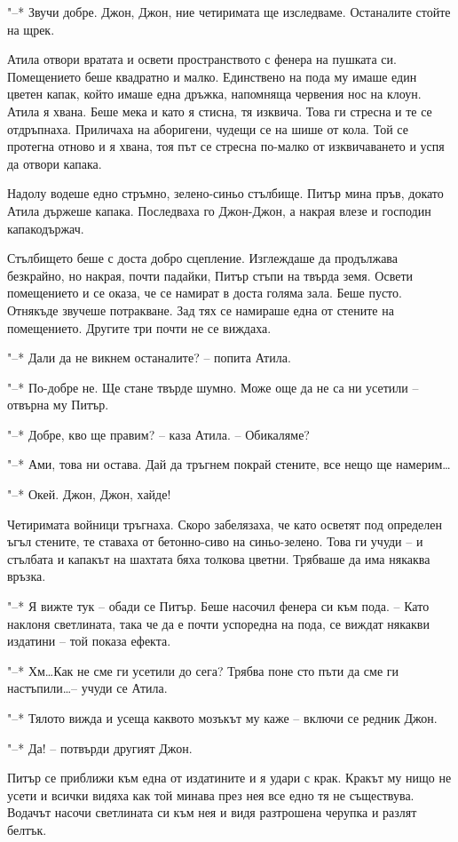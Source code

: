 \documentclass[ebook,openany,12pt]{memoir}
\begin{document}
"--* Звучи добре. Джон, Джон, ние четиримата ще изследваме. Останалите стойте на щрек.

Атила отвори вратата и освети пространството с фенера на пушката си. Помещението беше квадратно и малко. Единствено на пода му имаше един цветен капак, който имаше една дръжка, напомняща червения нос на клоун. Атила я хвана. Беше мека и като я стисна, тя изквича. Това ги стресна и те се отдръпнаха. Приличаха на аборигени, чудещи се на шише от кола. Той се протегна отново и я хвана, тоя път се стресна по-малко от изквичаването и успя да отвори капака.

Надолу водеше едно стръмно, зелено-синьо стълбище. Питър мина пръв, докато Атила държеше капака. Последваха го Джон-Джон, а накрая влезе и господин капакодържач.

Стълбището беше с доста добро сцепление. Изглеждаше да продължава безкрайно, но накрая, почти падайки, Питър стъпи на твърда земя. Освети помещението и се оказа, че се намират в доста голяма зала. Беше пусто. Отнякъде звучеше потракване. Зад тях се намираше една от стените на помещението. Другите три почти не се виждаха. 

"--* Дали да не викнем останалите? – попита Атила.

"--* По-добре не. Ще стане твърде шумно. Може още да не са ни усетили – отвърна му Питър.

"--* Добре, кво ще правим? – каза Атила. – Обикаляме?

"--* Ами, това ни остава. Дай да тръгнем покрай стените, все нещо ще намерим\ldots

"--* Окей. Джон, Джон, хайде!

Четиримата войници тръгнаха. Скоро забелязаха, че като осветят под определен ъгъл стените, те ставаха от бетонно-сиво на синьо-зелено. Това ги учуди – и стълбата и капакът на шахтата бяха толкова цветни. Трябваше да има някаква връзка.

"--* Я вижте тук – обади се Питър. Беше насочил фенера си към пода. – Като наклоня светлината, така че да е почти успоредна на пода, се виждат някакви издатини – той показа ефекта.

"--* Хм\ldots Как не сме ги усетили до сега? Трябва поне сто пъти да сме ги настъпили\ldots -- учуди се Атила.

"--* Тялото вижда и усеща каквото мозъкът му каже – включи се редник Джон.

"--* Да! – потвърди другият Джон.

Питър се приближи към една от издатините и я удари с крак. Кракът му нищо не усети и всички видяха как той минава през нея все едно тя не съществува. Водачът насочи светлината си към нея и видя разтрошена черупка и разлят белтък.
\end{document}
